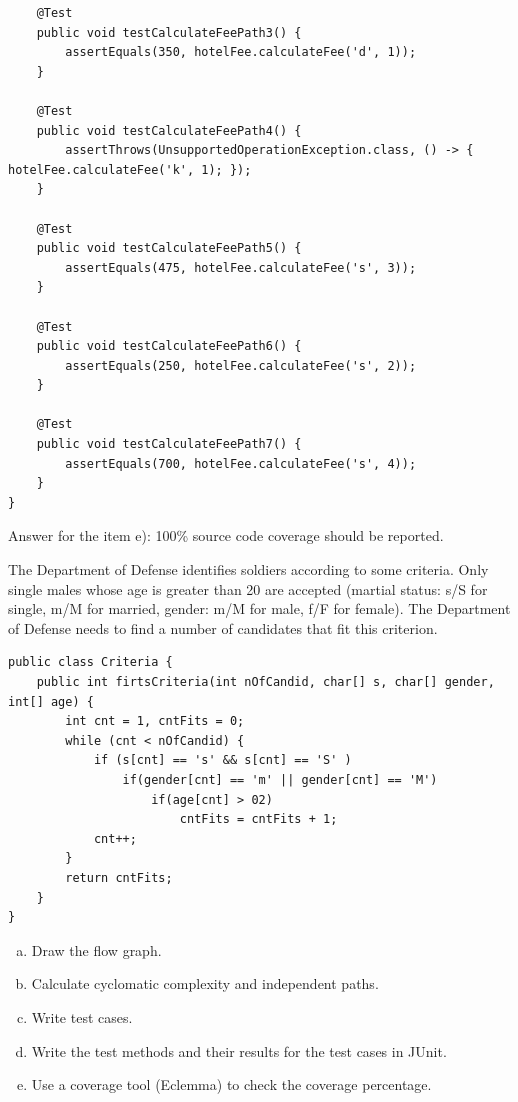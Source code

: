 \begin{solution}
\begin{lstlisting}
	@Test
	public void testCalculateFeePath3() {
		assertEquals(350, hotelFee.calculateFee('d', 1));
	}
	
	@Test
	public void testCalculateFeePath4() {
		assertThrows(UnsupportedOperationException.class, () -> { hotelFee.calculateFee('k', 1); });
	}
	
	@Test
	public void testCalculateFeePath5() {
		assertEquals(475, hotelFee.calculateFee('s', 3));
	}
	
	@Test
	public void testCalculateFeePath6() {
		assertEquals(250, hotelFee.calculateFee('s', 2));
	}
	
	@Test
	public void testCalculateFeePath7() {
		assertEquals(700, hotelFee.calculateFee('s', 4));
	}
}
    \end{lstlisting}
    
    Answer for the item e): 100\% source code coverage should be reported.
\end{solution}

\begin{exercise}
    The Department of Defense identifies soldiers according to some criteria. Only single males whose age is greater than 20 are accepted (martial status: s/S for single, m/M for married, gender: m/M for male, f/F for female). The Department of Defense needs to find a number of candidates that fit this criterion.
    
    \begin{lstlisting}
public class Criteria {
    public int firtsCriteria(int nOfCandid, char[] s, char[] gender, int[] age) {
        int cnt = 1, cntFits = 0;
        while (cnt < nOfCandid) {
            if (s[cnt] == 's' && s[cnt] == 'S' )
                if(gender[cnt] == 'm' || gender[cnt] == 'M')
                    if(age[cnt] > 02)
                        cntFits = cntFits + 1;
            cnt++;
        }	
        return cntFits;
    }
}
    \end{lstlisting}
    
    \begin{enumerate}[a),noitemsep]
        \item Draw the flow graph.
        \item Calculate cyclomatic complexity and independent paths.
        \item Write test cases.
        \item Write the test methods and their results for the test cases in JUnit.
        \item Use a coverage tool (Eclemma) to check the coverage percentage.
    \end{enumerate}
\end{exercise}

